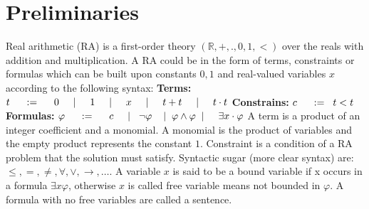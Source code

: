 \newtheorem{example}{Example}
\section{Preliminaries}
\label{sec:preliminaries}
Real arithmetic (RA) is a first-order theory $(\mathbb{R}, +, ., 0, 1, <)$ over the reals with addition and multiplication. A RA could be in the form of terms, constraints or formulas which can be built upon constants $0, 1$ and real-valued variables $x$ according to the following syntax:\newline
\textbf{Terms:}\hspace{18mm}$t\hspace{5mm}:=\hspace{5mm}0\hspace{5mm}|\hspace{5mm}1\hspace{5mm}|\hspace{5mm}x\hspace{5mm}|\hspace{5mm}t+t\hspace{5mm}|\hspace{5mm}t \cdot t$\newline
\textbf{Constrains:}\hspace{6mm} $c\hspace{5mm}:=\hspace{2mm}t<t$\newline
\textbf{Formulas:}\hspace{10mm} $\varphi\hspace{5mm}:=\hspace{5mm}c\hspace{5mm}|\hspace{3mm}\neg\varphi\hspace{4mm}|\hspace{2mm}\varphi\wedge\varphi\hspace{2mm}|\hspace{5mm}\exists x\cdot\varphi$\newline
A term is a product of an integer coefficient and a monomial. A monomial is the product of variables and the empty product represents the constant $1$. Constraint is a condition of a RA problem that the solution must satisfy. Syntactic sugar (more clear syntax) are: $\leq,=,\neq,\forall,\vee,\rightarrow,\ldots$. A variable $x$ is said to be a bound variable if x occurs in a formula $\exists x\varphi$, otherwise $x$ is called free variable means not bounded in $\varphi$. A formula with no free variables are called a sentence.\newline
